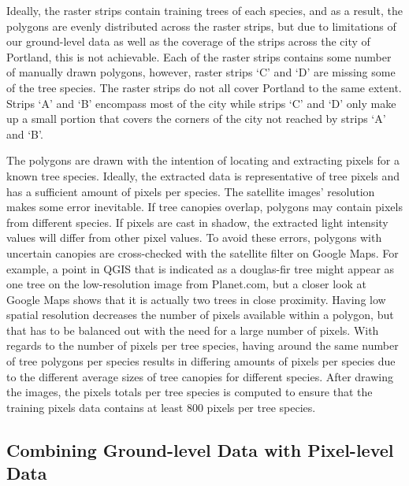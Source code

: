 \documentclass[12pt,twoside]{reedthesis}
\begin{document}
Ideally, the raster strips contain training trees of each species, and as a result, the polygons are evenly distributed across the raster strips, but due to limitations of our ground-level data as well as the coverage of the strips across the city of Portland, this is not achievable. Each of the raster strips contains some number of manually drawn polygons, however, raster strips `C' and `D' are missing some of the tree species. The raster strips do not all cover Portland to the same extent. Strips `A' and `B' encompass most of the city while strips `C' and `D' only make up a small portion that covers the corners of the city not reached by strips `A' and `B'.

The polygons are drawn with the intention of locating and extracting pixels for a known tree species. Ideally, the extracted data is representative of tree pixels and has a sufficient amount of pixels per species. The satellite images' resolution makes some error inevitable. If tree canopies overlap, polygons may contain pixels from different species. If pixels are cast in shadow, the extracted light intensity values will differ from other pixel values. To avoid these errors, polygons with uncertain canopies are cross-checked with the satellite filter on Google Maps. For example, a point in QGIS that is indicated as a douglas-fir tree might appear as one tree on the low-resolution image from Planet.com, but a closer look at Google Maps shows that it is actually two trees in close proximity. Having low spatial resolution decreases the number of pixels available within a polygon, but that has to be balanced out with the need for a large number of pixels. With regards to the number of pixels per tree species, having around the same number of tree polygons per species results in differing amounts of pixels per species due to the different average sizes of tree canopies for different species. After drawing the images, the pixels totals per tree species is computed to ensure that the training pixels data contains at least 800 pixels per tree species.

\hypertarget{combining-ground-level-data-with-pixel-level-data}{%
\subsection{Combining Ground-level Data with Pixel-level Data}\label{combining-ground-level-data-with-pixel-level-data}}
\end{document}
